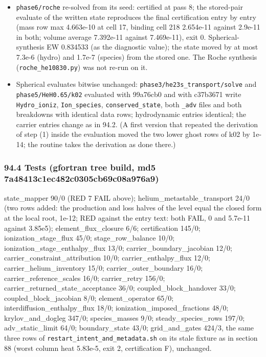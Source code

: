 \documentclass[english,a4paper]{my_memo}
\providecommand{\tightlist}{\setlength{\itemsep}{0pt}\setlength{\parskip}{0pt}}
\begin{document}
\begin{itemize}
\tightlist
\item
  \texttt{phase6/roche} re-solved from its seed: certified at pass 8; the stored-pair
  evaluate of the written state reproduces the final certification entry by
  entry (mass row max 4.663e-10 at cell 17, binding cell 218 2.654e-11 against
  2.9e-11 in both; volume average 7.392e-11 against 7.469e-11), exit 0.
  Spherical-synthesis EW 0.834533 (as the diagnostic value); the state moved
  by at most 7.3e-6 (hydro) and 1.7e-7 (species) from the stored one. The
  Roche synthesis (\texttt{roche\_he10830.py}) was not re-run on it.
\item
  Spherical evaluates bitwise unchanged: \texttt{phase3/he23s\_transport/solve} and
  \texttt{phase5/HeH0.65/k02} evaluated with 99a76cb0 and with c37b3671 write
  \texttt{Hydro\_ioniz}, \texttt{Ion\_species}, \texttt{conserved\_state}, both \texttt{\_adv} files and both
  breakdowns with identical data rows; hydrodynamic entries identical; the
  carrier entries change as in 94.2. (A first version that repeated the
  derivation of step (1) inside the evaluation moved the two lower ghost rows
  of k02 by 1e-14; the routine takes the derivation as done there.)
\end{itemize}

\subsubsection{94.4 Tests (gfortran tree build, md5 7a48413c1ec482c0305cb69c08a976a9)}\label{944-tests-gfortran-tree-build-md5-7a48413c1ec482c0305cb69c08a976a9}

state\_mapper 90/0 (RED 7 FAIL above); helium\_metastable\_transport 24/0 (two
rows added: the production and loss halves of the level equal the closed
form at the local root, 1e-12; RED against the entry text: both FAIL, 0 and
5.7e-11 against 3.85e5); element\_flux\_closure 6/6; certification 145/0;
ionization\_stage\_flux 45/0; stage\_row\_balance 10/0;
ionization\_stage\_enthalpy\_flux 13/0; carrier\_boundary\_jacobian 12/0;
carrier\_constraint\_attribution 10/0; carrier\_enthalpy\_flux 12/0;
carrier\_helium\_inventory 15/0; carrier\_outer\_boundary 16/0; carrier\_reference\_scales 16/0; carrier\_retry
156/0; carrier\_returned\_state\_acceptance 36/0; coupled\_block\_handover 33/0;
coupled\_block\_jacobian 8/0; element\_operator 65/0;
interdiffusion\_enthalpy\_flux 18/0; ionization\_imposed\_fractions 48/0;
krylov\_and\_dogleg 347/0; species\_masses 9/0; steady\_species\_rows 197/0;
adv\_static\_limit 64/0; boundary\_state 43/0; grid\_and\_gates 424/3, the same
three rows of \texttt{restart\_intent\_and\_metadata.sh} on its stale fixture as in
section 88 (worst column heat 5.83e-5, exit 2, certification F), unchanged.
\end{document}
